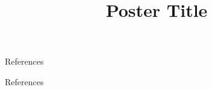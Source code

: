 \documentclass{tugPoster}
\title{Poster Title}
\begin{document}
	\maketitle

\begin{IPTtwocol}
	\begin{IPTrefsblock}{References}
		\begin{refs}
			\item \blindtext[2]
			\item \blindtext[2]
			\item \blindtext[2]
			\item \blindtext[2]
			\item \blindtext[2]
			\item \blindtext[2]
		\end{refs}
	\end{IPTrefsblock}
\end{IPTtwocol}

	\begin{IPTrefsblock}{References}
		\begin{refs}
			\item \blindtext[2]
			\item \blindtext[2]
			\item \blindtext[2]
			\item \blindtext[2]
			\item \blindtext[2]
			\item \blindtext[2]
		\end{refs}
	\end{IPTrefsblock}
\end{document}
